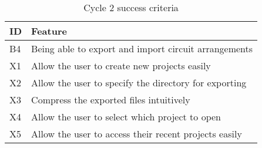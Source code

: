 \begin{table}[!h]
    \centering
    \begin{tabular}{@{}ll@{}} \toprule
        \textbf{ID} & \textbf{Feature} \\ \midrule 
        B4 & Being able to export and import circuit arrangements \\ 
        X1 & Allow the user to create new projects easily \\ 
        X2 & Allow the user to specify the directory for exporting \\ 
        X3 & Compress the exported files intuitively \\ 
        X4 & Allow the user to select which project to open \\ 
        X5 & Allow the user to access their recent projects easily \\ 
        \bottomrule
    \end{tabular}
    \caption{Cycle 2 success criteria}
    \label{tbl:succ-crit-c2}
\end{table}